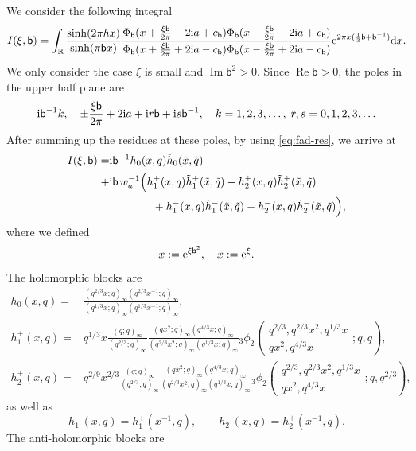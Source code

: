 \documentclass[a4paper,11pt]{article}
\theoremstyle{definition}
\def\IR{{\mathbb R}}
\newcommand{\re}{{\rm e}}
\newcommand{\ri}{{\rm i}}
\newcommand{\rd}{{\rm d}}
\def\tq{{\tilde{q}}}
\def\tx{{\tilde{x}}}
\newcommand{\be}{\begin{equation}}
\newcommand{\ee}{\end{equation}}
\newcommand{\bb}{\mathsf{b}}
\newcommand{\nn}{\nonumber \\}
\DeclareMathOperator{\real}{Re}
\DeclareMathOperator{\imag}{Im}
\newcommand{\qhg}[6]{{}_#1\phi_{#2}
  \left(\begin{matrix}
    #3  \\
    #4
  \end{matrix} ; #5, #6\right)}
\begin{document}
We consider the following integral
\begin{equation}
  I(\xi,\bb) =  \int_\IR
  \frac{\sinh(2\pi h x)}{\sinh(\pi\bb x)}
  \frac{\Phi_\bb(x+\frac{\xi\bb}{2\pi}-2\ri a+c_\bb)
    \Phi_\bb(x-\frac{\xi\bb}{2\pi}-2\ri a + c_\bb)}
  {\Phi_\bb(x+\frac{\xi\bb}{2\pi}+2\ri a -c_\bb)
    \Phi_\bb(x-\frac{\xi\bb}{2\pi}+2\ri a-c_\bb)}
  \re^{2\pi x(\frac{1}{3}\bb+\bb^{-1})}\rd x.
\end{equation}
We only consider the case $\xi$ is small and $\imag\bb^2>0$.  Since
$\real \bb >0$, the poles in the upper half plane are
\begin{equation}
  \ri\bb^{-1}k, \quad \pm\frac{\xi\bb}{2\pi}+2\ri a+\ri r \bb +\ri s
  \bb^{-1},\quad k = 1,2,3,\ldots,\;r,s = 0,1,2,3,\ldots
\end{equation}
%
After summing up the residues at these poles, by using \eqref{eq:fad-res}, we
arrive at
%
\begin{align}
  I(\xi,\bb) =
  &\ri\bb^{-1}h_0(x,q)\tilde{h}_0(\tx,\tq) \nn+
  &\ri\bb \,w_a^{-1}\Big(h^+_1(x,q)\tilde{h}^+_1(\tx,\tq)
    -h^+_2(x,q)\tilde{h}^+_2(\tx,\tq)\nn
  &\phantom{=====}+h^-_1(x,q)\tilde{h}^-_1(\tx,\tq)
    -h^-_2(x,q)\tilde{h}^-_2(\tx,\tq)
    \Big),
    \label{eq:mass-fac}
\end{align}
where we defined
%
\begin{equation}
  x := \re^{\xi\bb^2},\quad \tx:= \re^{\xi}.
\end{equation}
The holomorphic blocks are
\begin{subequations}
\begin{align}
  h_0(x,q) =
  &\frac{(q^{2/3}x;q)_\infty(q^{2/3}x^{-1};q)_\infty}
    {(q^{1/3}x;q)_\infty(q^{1/3}x^{-1};q)_\infty},\\
  h^+_1(x,q) =
  &q^{1/3}x\frac{(q;q)_\infty}{(q^{2/3};q)_\infty}
    \frac{(qx^2;q)_\infty(q^{4/3}x;q)_\infty}
    {(q^{2/3}x^2;q)_\infty(q^{1/3}x;q)_\infty}
    \qhg{3}{2}{q^{2/3},q^{2/3}x^2,q^{1/3}x}{qx^2,q^{4/3}x}{q}{q},\\
  h^+_2(x,q) =
  &q^{2/9}x^{2/3}\frac{(q;q)_\infty}{(q^{2/3};q)_\infty}
    \frac{(qx^2;q)_\infty(q^{4/3}x;q)_\infty}
    {(q^{2/3}x^2;q)_\infty(q^{1/3}x;q)_\infty}
    \qhg{3}{2}{q^{2/3},q^{2/3}x^2,q^{1/3}x}{qx^2,q^{4/3}x}{q}{q^{2/3}},
    \end{align}
    \end{subequations}
  as well as
  \be h^-_1(x,q) = h^+_1(x^{-1},q),\qquad 
  h^-_2(x,q) = h^+_2(x^{-1},q).
\ee
%
The anti-holomorphic blocks are
%
\end{document}
